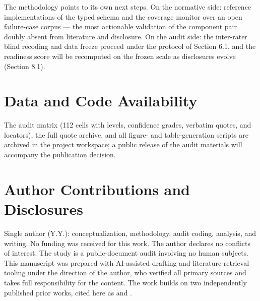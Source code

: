 \documentclass[10pt]{article}
\begin{document}
The methodology points to its own next steps. On the normative side: reference implementations of the typed schema and the coverage monitor over an open failure-case corpus --- the most actionable validation of the component pair doubly absent from literature and disclosure. On the audit side: the inter-rater blind recoding and data freeze proceed under the protocol of Section 6.1, and the readiness score will be recomputed on the frozen scale as disclosures evolve (Section 8.1).

\section*{Data and Code Availability}

The audit matrix (112 cells with levels, confidence grades, verbatim quotes, and locators), the full quote archive, and all figure- and table-generation scripts are archived in the project workspace; a public release of the audit materials will accompany the publication decision.

\section*{Author Contributions and Disclosures}

Single author (Y.Y.): conceptualization, methodology, audit coding, analysis, and writing. No funding was received for this work. The author declares no conflicts of interest. The study is a public-document audit involving no human subjects. This manuscript was prepared with AI-assisted drafting and literature-retrieval tooling under the direction of the author, who verified all primary sources and takes full responsibility for the content. The work builds on two independently published prior works, cited here as \cite{ref5} and \cite{ref6}.



\end{document}
